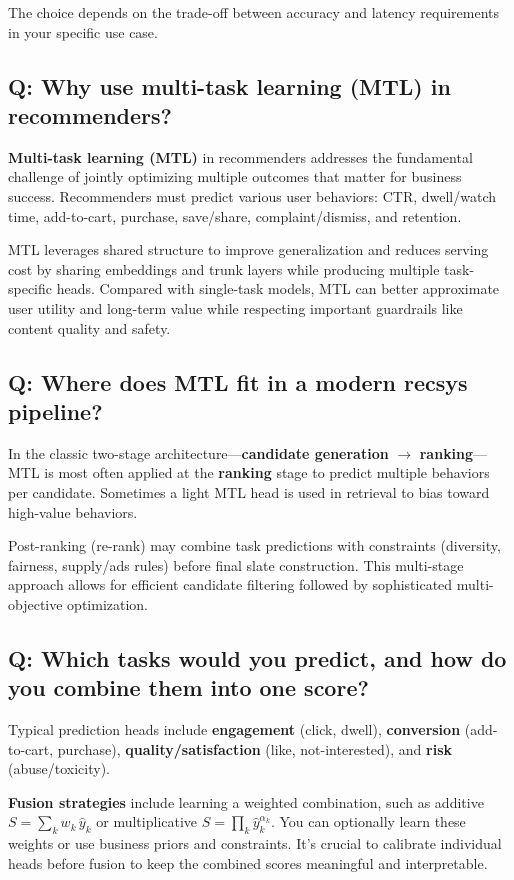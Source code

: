 The choice depends on the trade-off between accuracy and latency requirements in your specific use case.

\subsection*{Q: Why use multi-task learning (MTL) in recommenders?}
\textbf{Multi-task learning (MTL)} in recommenders addresses the fundamental challenge of jointly optimizing multiple outcomes that matter for business success. Recommenders must predict various user behaviors: CTR, dwell/watch time, add-to-cart, purchase, save/share, complaint/dismiss, and retention.

MTL leverages shared structure to improve generalization and reduces serving cost by sharing embeddings and trunk layers while producing multiple task-specific heads. Compared with single-task models, MTL can better approximate user utility and long-term value while respecting important guardrails like content quality and safety.

\subsection*{Q: Where does MTL fit in a modern recsys pipeline?}
In the classic two-stage architecture---\textbf{candidate generation} $\rightarrow$ \textbf{ranking}---MTL is most often applied at the \textbf{ranking} stage to predict multiple behaviors per candidate. Sometimes a light MTL head is used in retrieval to bias toward high-value behaviors.

Post-ranking (re-rank) may combine task predictions with constraints (diversity, fairness, supply/ads rules) before final slate construction. This multi-stage approach allows for efficient candidate filtering followed by sophisticated multi-objective optimization.

\subsection*{Q: Which tasks would you predict, and how do you combine them into one score?}
Typical prediction heads include \textbf{engagement} (click, dwell), \textbf{conversion} (add-to-cart, purchase), \textbf{quality/satisfaction} (like, not-interested), and \textbf{risk} (abuse/toxicity).

\textbf{Fusion strategies} include learning a weighted combination, such as additive $S=\sum_k w_k \,\hat y_k$ or multiplicative $S=\prod_k \hat y_k^{\alpha_k}$. You can optionally learn these weights or use business priors and constraints. It's crucial to calibrate individual heads before fusion to keep the combined scores meaningful and interpretable.

